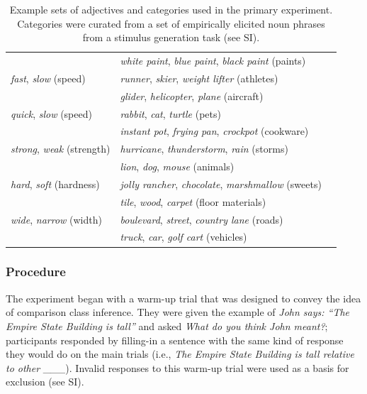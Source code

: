 \documentclass[doc, floatsintext]{apa6}
\begin{document}
\begin{table}[!ht]
\begin{tabularx}{\textwidth}{lll}
								  & \emph{white paint}, \emph{blue paint}, \emph{black paint}  (paints) \\
   \emph{fast}, \emph{slow} (speed)   &  \emph{runner}, \emph{skier}, \emph{weight lifter} (athletes) \\
								  &  \emph{glider}, \emph{helicopter}, \emph{plane} (aircraft) \\
  \emph{quick}, \emph{slow} (speed) &  \emph{rabbit}, \emph{cat}, \emph{turtle} (pets) \\
							  &  \emph{instant pot}, \emph{frying pan}, \emph{crockpot} (cookware) \\
  \emph{strong}, \emph{weak} (strength) &  \emph{hurricane}, \emph{thunderstorm}, \emph{rain} (storms)\\
						  &  \emph{lion}, \emph{dog}, \emph{mouse} (animals)\\
  \emph{hard}, \emph{soft} (hardness) &  \emph{jolly rancher}, \emph{chocolate}, \emph{marshmallow} (sweets)\\
							  &  \emph{tile}, \emph{wood}, \emph{carpet} (floor materials)\\
  \emph{wide}, \emph{narrow} (width) & \emph{boulevard}, \emph{street}, \emph{country lane} (roads) \\
							  & \emph{truck}, \emph{car}, \emph{golf cart} (vehicles) \\
   \hline
\end{tabularx}
\caption{Example sets of adjectives and categories used in the primary experiment.
Categories were curated from a set of empirically elicited noun phrases from a stimulus generation task (see SI).}
\label{tab:1}
\endgroup
\end{table}



\subsubsection{Procedure}

The experiment began with a warm-up trial that was designed to convey the idea of comparison class inference.
They were given the example of \emph{John says: ``The Empire State Building is tall''} and asked \emph{What do you think John meant?}; participants responded by filling-in a sentence with the same kind of response they would do on the main trials (i.e., \emph{The Empire State Building is tall relative to other \_\_\_}).
Invalid responses to this warm-up trial were used as a basis for exclusion (see SI).
\end{document}
